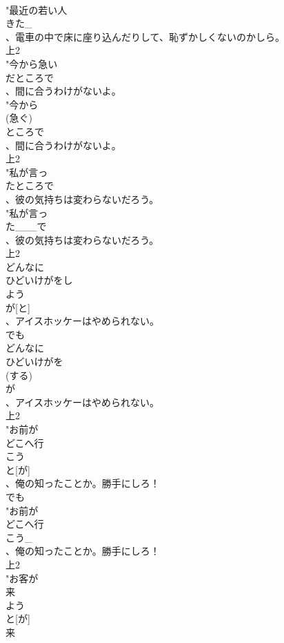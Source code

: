 \documentclass[8pt]{extreport}
\begin{document}
\begin{CJK}{UTF8}{min}
\\	"最近の若い人
\\	きた_
\\	、電車の中で床に座り込んだりして、恥ずかしくないのかしら。
\\	上2
\\	"今から急い
\\	だところで
\\	、間に合うわけがないよ。
\\	"今から
\\	(急ぐ)
\\	ところで
\\	、間に合うわけがないよ。
\\	上2
\\	"私が言っ
\\	たところで
\\	、彼の気持ちは変わらないだろう。
\\	"私が言っ
\\	た___で
\\	、彼の気持ちは変わらないだろう。
\\	上2
\\	どんなに
\\	ひどいけがをし
\\	よう
\\	が[と]
\\	、アイスホッケーはやめられない。
\\	でも 
\\	どんなに
\\	ひどいけがを
\\	(する)
\\	が
\\	、アイスホッケーはやめられない。
\\	上2
\\	"お前が
\\	どこへ行
\\	こう
\\	と[が]
\\	、俺の知ったことか。勝手にしろ！
\\	でも 
\\	"お前が
\\	どこへ行
\\	こう_
\\	、俺の知ったことか。勝手にしろ！
\\	上2
\\	"お客が
\\	来
\\	よう
\\	と[が]
\\	来

\end{CJK}
\end{document}
